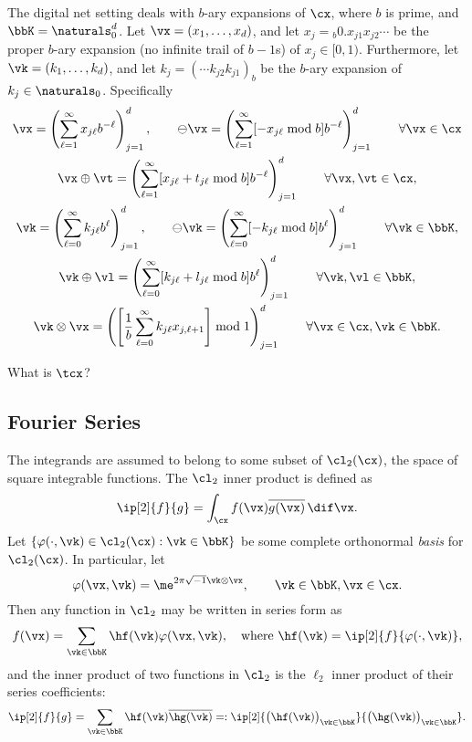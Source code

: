\documentclass[]{elsarticle}
\begin{document}
The digital net setting deals with $b$-ary expansions of $\cx$, where $b$ is prime, and $\bbK=\naturals_0^d$.  Let $\vx=(x_1, \ldots, x_d)$, and let $x_j={}_b 0.x_{j1} x_{j2} \cdots $ be the proper $b$-ary expansion (no infinite trail of $b-1$s) of $x_j \in [0,1)$.  Furthermore, let $\vk=(k_1, \ldots, k_d)$, and let $k_j=(\cdots k_{j2} k_{j1})_b$ be the $b$-ary expansion of $k_j \in \naturals_0$.  Specifically
\begin{gather*}
\vx = \left(\sum_{\ell=1}^{\infty} x_{j\ell} b^{-\ell}\right)_{j=1}^d, \qquad \ominus \vx = \left(\sum_{\ell=1}^{\infty} [-x_{j\ell} \bmod b] b^{-\ell}\right)_{j=1}^d \qquad \forall \vx \in \cx  \\ 
\vx \oplus \vt = \left(\sum_{\ell=1}^{\infty} [x_{j\ell} + t_{j\ell} \bmod b] b^{-\ell}\right)_{j=1}^d \qquad \forall \vx, \vt \in \cx, \\
\vk =  \left(\sum_{\ell=0}^{\infty} k_{j\ell} b^{\ell}\right)_{j=1}^d, \qquad \ominus \vk = \left(\sum_{\ell=0}^{\infty} [-k_{j\ell} \bmod b] b^{\ell}\right)_{j=1}^d \qquad \forall \vk \in \bbK, \\
\vk \oplus \vl = \left(\sum_{\ell=0}^{\infty} [k_{j\ell} + l_{j\ell} \bmod b] b^{\ell}\right)_{j=1}^d \qquad \forall \vk, \vl \in \bbK, \\
\vk \otimes \vx = \left( \left[\frac 1b \sum_{\ell=0}^{\infty} k_{j\ell}x_{j,\ell+1} \right] \bmod 1 \right)_{j=1}^d \qquad \forall \vx \in \cx, \vk \in \bbK.
\end{gather*}

What is $\tcx$?

\subsection{Fourier Series}

The integrands are assumed to belong to some subset of $\cl_2(\cx)$, the space of square integrable functions.  The $\cl_2$ inner product is defined as 
\[
\ip[2]{f}{g} = \int_{\cx} f(\vx) \overline{g(\vx)} \, \dif \vx.
\]
Let $\{\varphi(\cdot,\vk) \in \cl_2(\cx) : \vk \in \bbK\}$ be some complete orthonormal \emph{basis} for $\cl_2(\cx)$. In particular, let 
\[
\varphi(\vx,\vk)  = \me^{2 \pi \sqrt{-1} \vk \otimes \vx}, \qquad \vk \in \bbK, \vx \in \cx.
\]
Then any function in $\cl_2$ may be written in series form as
\begin{equation} \label{Fourierdef}
f(\vx) = \sum_{\vk \in \bbK} \hf(\vk) \varphi(\vx,\vk), \quad \text{where } \hf(\vk) = \ip[2]{f}{\varphi(\cdot,\vk)},
\end{equation}
and the inner product of two functions in $\cl_2$ is the $\ell_2$ inner product of their series coefficients:
\[
\ip[2]{f}{g} = \sum_{\vk \in \bbK} \hf(\vk)\overline{\hg(\vk)} =: \ip[2]{\bigl(\hf(\vk)\bigr)_{\vk \in \bbK}}{\bigl ( \hg(\vk)\bigr )_{\vk \in \bbK}}.
\]
\end{document}
